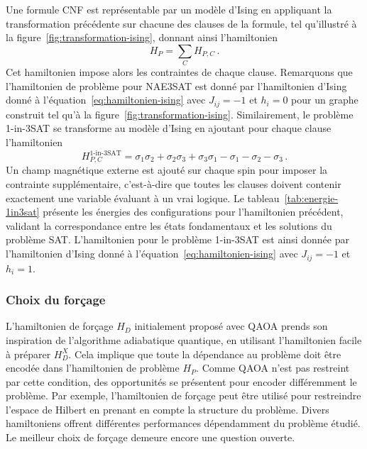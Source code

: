 Une formule CNF est représentable par un modèle d'Ising en appliquant la transformation précédente sur chacune des clauses de la formule, tel qu'illustré à la figure~\ref{fig:transformation-ising}, donnant ainsi l'hamiltonien 
\begin{equation}
    H_{P} = \sum_{C} H_{P, C} \,.
\end{equation}
Cet hamiltonien impose alors les contraintes de chaque clause. Remarquons que l'hamiltonien de problème pour NAE3SAT est donné par l'hamiltonien d'Ising donné à l'équation~\ref{eq:hamiltonien-ising} avec $J_{ij}=-1$ et $h_{i}=0$ pour un graphe construit tel qu'à la figure~\ref{fig:transformation-ising}. Similairement, le problème 1-in-3SAT se transforme au modèle d'Ising en ajoutant pour chaque clause l'hamiltonien
\begin{equation}
   H_{P, C}^{\text{1-in-3SAT}} = \sigma_{1}\sigma_{2} + \sigma_{2}\sigma_{3} + \sigma_{3}\sigma_{1} - \sigma_{1} - \sigma_{2} - \sigma_{3} \,.
\end{equation}
Un champ magnétique externe est ajouté sur chaque spin pour imposer la contrainte supplémentaire, c'est-à-dire que toutes les clauses doivent contenir exactement une variable évaluant à un vrai logique. Le tableau~\ref{tab:energie-1in3sat} présente les énergies des configurations pour l'hamiltonien précédent, validant la correspondance entre les états fondamentaux et les solutions du problème SAT. L'hamiltonien pour le problème 1-in-3SAT est ainsi donnée par l'hamiltonien d'Ising donné à l'équation~\ref{eq:hamiltonien-ising} avec $J_{ij}=-1$ et $h_{i}=1$.


\subsubsection{Choix du forçage}

L'hamiltonien de forçage $H_{D}$ initialement proposé avec QAOA prends son inspiration de l'algorithme adiabatique quantique, en utilisant l'hamiltonien facile à préparer $H_{D}^{X}$. Cela implique que toute la dépendance au problème doit être encodée dans l'hamiltonien de problème $H_{P}$. Comme QAOA n'est pas restreint par cette condition, des opportunités se présentent pour encoder différemment le problème. Par exemple, l'hamiltonien de forçage peut être utilisé pour restreindre l'espace de Hilbert en prenant en compte la structure du problème. Divers hamiltoniens offrent différentes performances dépendamment du problème étudié. Le meilleur choix de forçage demeure encore une question ouverte.


